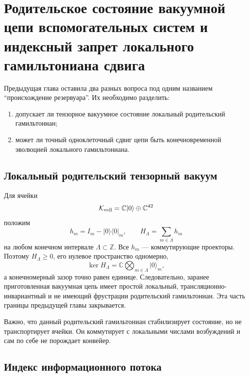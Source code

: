 \chapter{Родительское состояние вакуумной цепи вспомогательных систем и индексный запрет локального гамильтониана сдвига}
\label{ch:v8-vacuum-chain-parent-state-local-hamiltonian-origin-gate}

Предыдущая глава оставила два разных вопроса под одним названием
``происхождение резервуара''. Их необходимо разделить:
\begin{enumerate}
 \item допускает ли тензорное вакуумное состояние локальный родительский гамильтониан;
 \item может ли точный одноклеточный сдвиг цепи быть конечновременной
 эволюцией локального гамильтониана.
\end{enumerate}

\section{Локальный родительский тензорный вакуум}

Для ячейки
\begin{equation}
 \mathcal K_{\rm cell}=\mathbb C|0\rangle\oplus\mathbb C^{42}
\end{equation}
положим
\begin{equation}
 h_m=I_m-|0\rangle\langle0|_m,
 \qquad
 H_\Lambda=\sum_{m\in\Lambda}h_m
\end{equation}
на любом конечном интервале $\Lambda\subset\mathbb Z$. Все $h_m$ ---
коммутирующие проекторы. Поэтому $H_\Lambda\geq0$, его нулевое
пространство одномерно,
\begin{equation}
 \ker H_\Lambda
 =\mathbb C\bigotimes_{m\in\Lambda}|0\rangle_m,
\end{equation}
а конечномерный зазор точно равен единице. Следовательно, заранее
приготовленная вакуумная цепь имеет простой локальный, трансляционно-инвариантный
и не имеющий фрустрации родительский гамильтониан. Эта часть границы предыдущей главы закрывается.

Важно, что данный родительский гамильтониан стабилизирует состояние, но не транспортирует
ячейки. Он коммутирует с локальными числами возбуждений и сам по себе не
порождает конвейер.

\section{Индекс информационного потока}

